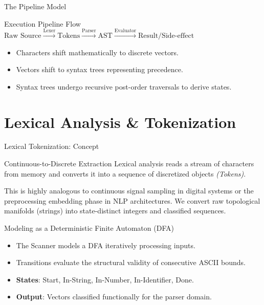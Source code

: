 \documentclass[aspectratio=169]{beamer}
\begin{document}
\begin{frame}{The Pipeline Model}
    \begin{block}{Execution Pipeline Flow}
        $\text{Raw Source} \xrightarrow{\text{Lexer}} \text{Tokens} \xrightarrow{\text{Parser}} \text{AST} \xrightarrow{\text{Evaluator}} \text{Result/Side-effect}$
    \end{block}
    \vspace{0.5cm}
    \begin{itemize}
        \item Characters shift mathematically to discrete vectors.
        \item Vectors shift to syntax trees representing precedence.
        \item Syntax trees undergo recursive post-order traversals to derive states.
    \end{itemize}
\end{frame}


\section{Lexical Analysis \& Tokenization}

\begin{frame}{Lexical Tokenization: Concept}
    \begin{block}{Continuous-to-Discrete Extraction}
        Lexical analysis reads a stream of characters from memory and converts it into a sequence of discretized objects \textit{(Tokens)}.
    \end{block}
    This is highly analogous to continuous signal sampling in digital systems or the preprocessing embedding phase in NLP architectures. We convert raw topological manifolds (strings) into state-distinct integers and classified sequences.
\end{frame}

\begin{frame}{Modeling as a Deterministic Finite Automaton (DFA)}
    \begin{itemize}
        \item The Scanner models a DFA iteratively processing inputs.
        \item Transitions evaluate the structural validity of consecutive ASCII bounds.
        \item \textbf{States}: Start, In-String, In-Number, In-Identifier, Done.
        \item \textbf{Output}: Vectors classified functionally for the parser domain.
    \end{itemize}
\end{frame}
\end{document}
